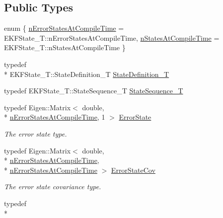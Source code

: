 \subsection*{Public Types}
\begin{DoxyCompactItemize}
\item 
enum \{ \hyperlink{classmsf__core_1_1MSF__Core_a2bca35a2fba08b2fd5cc9963acc9c505afd5aaa703aae2fc6f022eec724b358f6}{n\-Error\-States\-At\-Compile\-Time} =  E\-K\-F\-State\-\_\-\-T\-:\-:n\-Error\-States\-At\-Compile\-Time, 
\hyperlink{classmsf__core_1_1MSF__Core_a2bca35a2fba08b2fd5cc9963acc9c505af1d75af5cfbf0cb1e0e9b04c5d944d6e}{n\-States\-At\-Compile\-Time} =  E\-K\-F\-State\-\_\-\-T\-:\-:n\-States\-At\-Compile\-Time
 \}
\item 
typedef \\*
E\-K\-F\-State\-\_\-\-T\-::\-State\-Definition\-\_\-\-T \hyperlink{classmsf__core_1_1MSF__Core_ace7a0e25e3945f3e84a6b16f72d1f1dd}{State\-Definition\-\_\-\-T}
\item 
typedef E\-K\-F\-State\-\_\-\-T\-::\-State\-Sequence\-\_\-\-T \hyperlink{classmsf__core_1_1MSF__Core_af8de96f8f0a8677c79c12563f86b26d3}{State\-Sequence\-\_\-\-T}
\item 
typedef Eigen\-::\-Matrix$<$ double, \\*
\hyperlink{classmsf__core_1_1MSF__Core_a2bca35a2fba08b2fd5cc9963acc9c505afd5aaa703aae2fc6f022eec724b358f6}{n\-Error\-States\-At\-Compile\-Time}, 1 $>$ \hyperlink{classmsf__core_1_1MSF__Core_a01a15136971c11456e539f00b88fbf1a}{Error\-State}
\begin{DoxyCompactList}\small\item\em The error state type. \end{DoxyCompactList}\item 
typedef Eigen\-::\-Matrix$<$ double, \\*
\hyperlink{classmsf__core_1_1MSF__Core_a2bca35a2fba08b2fd5cc9963acc9c505afd5aaa703aae2fc6f022eec724b358f6}{n\-Error\-States\-At\-Compile\-Time}, \\*
\hyperlink{classmsf__core_1_1MSF__Core_a2bca35a2fba08b2fd5cc9963acc9c505afd5aaa703aae2fc6f022eec724b358f6}{n\-Error\-States\-At\-Compile\-Time} $>$ \hyperlink{classmsf__core_1_1MSF__Core_ad9b84aa4937f3c8354045b5c97ba2dcc}{Error\-State\-Cov}
\begin{DoxyCompactList}\small\item\em The error state covariance type. \end{DoxyCompactList}\item 
typedef \\*

\end{DoxyCompactItemize}
